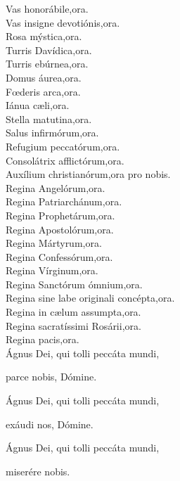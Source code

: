 Vas honorábile,\hfill ora.\\
Vas insigne devotiónis,\hfill ora.\\
Rosa mýstica,\hfill ora.\\
Turris Davídica,\hfill ora.\\
Turris ebúrnea,\hfill ora.\\
Domus áurea,\hfill ora.\\
F{\oe}deris arca,\hfill ora.\\
Iánua c{\ae}li,\hfill ora.\\
Stella matutina,\hfill ora.\\
Salus infirmórum,\hfill ora.\\
Refugium peccatórum,\hfill ora.\\
Consolátrix afflictórum,\hfill ora.\\
Auxílium christianórum,\hfill ora pro nobis.\\
Regina Angelórum,\hfill ora.\\
Regina Patriarchánum,\hfill ora.\\
Regina Prophetárum,\hfill ora.\\
Regina Apostolórum,\hfill ora.\\
Regina Mártyrum,\hfill ora.\\
Regina Confessórum,\hfill ora.\\
Regina Vírginum,\hfill ora.\\
Regina Sanctórum ómnium,\hfill ora.\\
Regina sine labe originali concépta,\hfill ora.\\
Regina in c{\ae}lum assumpta,\hfill ora.\\
Regina sacratíssimi Rosárii,\hfill ora.\\
Regina pacis,\hfill ora.\\
Ágnus Dei, qui tolli peccáta mundi,

\hfill parce nobis, Dómine.

\noindent Ágnus Dei, qui tolli peccáta mundi, 

\hfill exáudi nos, Dómine.

\noindent Ágnus Dei, qui tolli peccáta mundi, 

\hfill miserére nobis.
